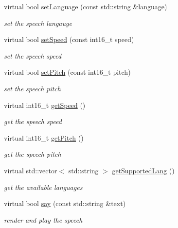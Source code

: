 \begin{DoxyCompactItemize}
\item 
virtual bool \hyperlink{classSpeech__IDL_abd517ac2ab8310d2eb0dcd756782ed85}{set\+Language} (const std\+::string \&language)
\begin{DoxyCompactList}\small\item\em set the speech langauge \end{DoxyCompactList}\item 
virtual bool \hyperlink{classSpeech__IDL_ac4e0fe8f295cc10ed6cc2c3f5326db8e}{set\+Speed} (const int16\+\_\+t speed)
\begin{DoxyCompactList}\small\item\em set the speech speed \end{DoxyCompactList}\item 
virtual bool \hyperlink{classSpeech__IDL_a76a3da1b097f0e7b6cd79e77135ddf43}{set\+Pitch} (const int16\+\_\+t pitch)
\begin{DoxyCompactList}\small\item\em set the speech pitch \end{DoxyCompactList}\item 
virtual int16\+\_\+t \hyperlink{classSpeech__IDL_a41f5ec2698b26193b2819c5acc095ed2}{get\+Speed} ()
\begin{DoxyCompactList}\small\item\em get the speech speed \end{DoxyCompactList}\item 
virtual int16\+\_\+t \hyperlink{classSpeech__IDL_a273ed2a855520a7ab6babcb6bffa02fc}{get\+Pitch} ()
\begin{DoxyCompactList}\small\item\em get the speech pitch \end{DoxyCompactList}\item 
virtual std\+::vector$<$ std\+::string $>$ \hyperlink{classSpeech__IDL_a003d0864e1211db39b8b395e8462f249}{get\+Supported\+Lang} ()
\begin{DoxyCompactList}\small\item\em get the available languages \end{DoxyCompactList}\item 
virtual bool \hyperlink{classSpeech__IDL_a0cc774034f1da13dcaf091c5e65f5a56}{say} (const std\+::string \&text)
\begin{DoxyCompactList}\small\item\em render and play the speech \end{DoxyCompactList}\item 

\end{DoxyCompactItemize}
